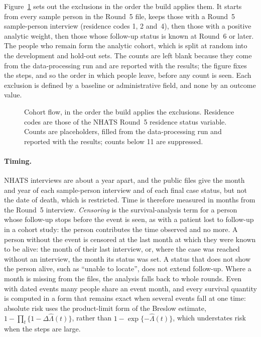 Figure~\ref{fig:methods-flow} sets out the exclusions in the order the build applies them. It starts from every sample person in the Round~5 file, keeps those with a Round~5 sample-person interview (residence codes 1, 2 and~4), then those with a positive analytic weight, then those whose follow-up status is known at Round~6 or later. The people who remain form the analytic cohort, which is split at random into the development and hold-out sets. The counts are left blank because they come from the data-processing run and are reported with the results; the figure fixes the steps, and so the order in which people leave, before any count is seen. Each exclusion is defined by a baseline or administrative field, and none by an outcome value.

\begin{figure}[htbp]
\centering

\caption[Cohort flow]{Cohort flow, in the order the build applies the exclusions. Residence codes are those of the NHATS Round~5 residence status variable. Counts are placeholders, filled from the data-processing run and reported with the results; counts below 11 are suppressed.}
\label{fig:methods-flow}
\end{figure}

\paragraph{Timing.} NHATS interviews are about a year apart, and the public files give the month and year of each sample-person interview and of each final case status, but not the date of death, which is restricted. Time is therefore measured in months from the Round~5 interview. \emph{Censoring} is the survival-analysis term for a person whose follow-up stops before the event is seen, as with a patient lost to follow-up in a cohort study: the person contributes the time observed and no more. A person without the event is censored at the last month at which they were known to be alive: the month of their last interview, or, where the case was reached without an interview, the month its status was set. A status that does not show the person alive, such as ``unable to locate'', does not extend follow-up. Where a month is missing from the files, the analysis falls back to whole rounds. Even with dated events many people share an event month, and every survival quantity is computed in a form that remains exact when several events fall at one time: absolute risk uses the product-limit form of the Breslow estimate, $1-\prod_t\{1-\Delta\hat\Lambda(t)\}$, rather than $1-\exp\{-\hat\Lambda(t)\}$, which understates risk when the steps are large.

